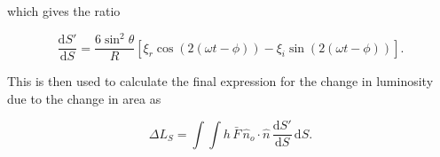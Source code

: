 \documentclass[11pt]{amsart}
\begin{document}
which gives the ratio

\begin{equation}
\frac{\text{d}S'}{\text{d}S}  =  \frac{6 \sin^{2} \theta}{R}  \left[ \xi_{r} \cos (2 ( \omega t - \phi)) - \xi_{i} \sin (2 ( \omega t - \phi)) \right] .
\end{equation}

This is then used to calculate the final expression for the change in luminosity due to the change in area as

\begin{equation}
\Delta L_{S} = \int \int h \, \bar{F} \, \hat{n}_{o} \! \cdot \! \hat{n} \, \frac{\text{d}S'}{\text{d}S} \, \text{d}S.
\end{equation}










\end{document}
